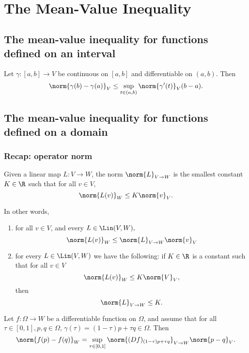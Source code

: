 \section{The Mean-Value Inequality}

\subsection{The mean-value inequality for functions defined on an interval}
\begin{theorem}
    Let $\gamma: [a,b] \to V$ be continuous on $[a,b]$ and differentiable on $(a,b)$. Then
    $$\norm{\gamma(b) - \gamma(a)}_V \le \sup_{t \in (a,b)} \norm{\gamma^\prime(t)}_V(b-a).$$
\end{theorem}


\subsection{The mean-value inequality for functions defined on a domain}
\subsubsection*{Recap: operator norm}
Given a linear map $L: V \to W$, the  norm $\norm{L}_{V \to W}$ is the smallest
constant $K \in \R$ such that for all $v \in V$,
$$\norm{L(v)}_W \le K\norm{v}_V.$$

In other words,
\begin{enumerate}
    \item for all $v \in V$, and every $L \in \Lin(V,W),$ 
        $$\norm{L(v)}_W \le \norm{L}_{V \to W}\norm{v}_V$$
    \item for every $L \in \Lin(V,W)$ we have the following: if $K \in \R$ is a constant
        such that for all $v \in V$
        $$\norm{L(v)}_W \le K\norm{V}_V,$$
        then
        $$\norm{L}_{V \to W} \le K.$$
\end{enumerate}

\begin{proposition}
    Let $f:\Omega \to W$ be a differentiable function on $\Omega$, and assume that for all $\tau \in [0,1], p,q\in\Omega$,
    $\gamma(\tau) = (1-\tau)p + \tau q \in \Omega$.
    Then 
    $$\norm{f(p) - f(q)}_W = \sup_{\tau \in [0,1]} \norm{(Df)_{(1-\tau)p+\tau q}}_{V\to W}\norm{p-q}_V.$$
\end{proposition}

